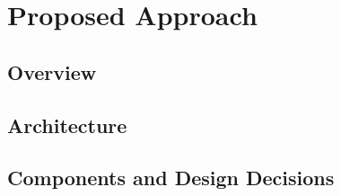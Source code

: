 
%

\chapter{Proposed Approach}
\label{cha:design}

\section{Overview}
\label{sec:design-overview}



\section{Architecture}
\label{sec:architecture}



\section{Components and Design Decisions}
\label{sec:components}



